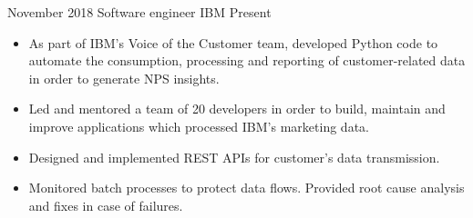 %
%
%


\begin{experiences}
    \experience
        {November 2018}
        {Software engineer}
        {IBM}
        {Present}
        {
            \begin{itemize}
                \item As part of IBM's Voice of the Customer team, developed Python code to automate the
                    consumption, processing and reporting of customer-related data in order to generate NPS insights.
                \item Led and mentored a team of 20 developers in order to build, maintain and improve
                    applications which processed IBM's marketing data.
                \item Designed and implemented REST APIs for customer's data transmission.
                \item Monitored batch processes to protect data flows. Provided root cause analysis and fixes in case of failures.

\end{itemize}}
\end{experiences}

